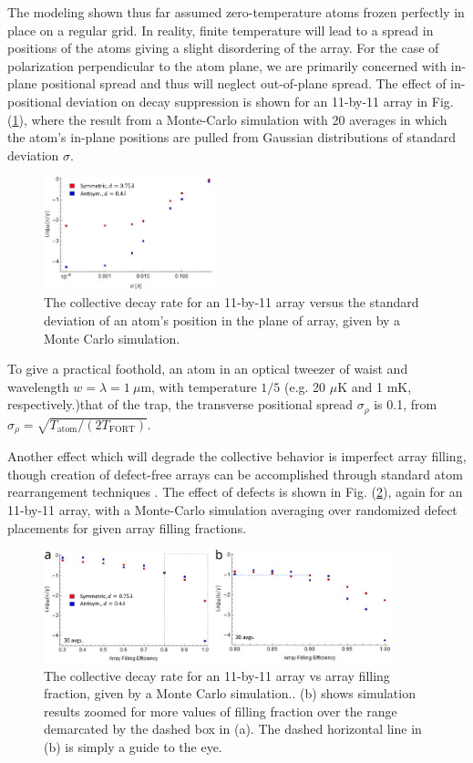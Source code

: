 The modeling shown thus far assumed zero-temperature atoms frozen perfectly in place on a regular grid. In reality, finite temperature will lead to a spread in positions of the atoms giving a slight disordering of the array. For the case of polarization perpendicular to the atom plane, we are primarily concerned with in-plane positional spread and thus will neglect out-of-plane spread. The effect of in-positional deviation on decay suppression is shown for an 11-by-11 array in Fig. (\ref{fig:superradiance_vs_atomspread}), where the result from a Monte-Carlo simulation with 20 averages in which the atom's in-plane positions are pulled from Gaussian distributions of standard deviation $\sigma$.
\begin{figure}[!ht]
    \centering
    \includegraphics[width=0.45\textwidth]{Images/superradiance_vs_atom_spread.pdf}
    \caption{The collective decay rate for an 11-by-11 array versus the standard deviation of an atom's position in the plane of array, given by a Monte Carlo simulation.}
    \label{fig:superradiance_vs_atomspread}
\end{figure}
To give a practical foothold, an atom in an optical tweezer of waist and wavelength $w=\lambda=1~\mu$m, with temperature $1/5$ (e.g. 20 $\mu$K and 1 mK, respectively.)that of the trap, the transverse positional spread $\sigma_{\rho}$ is 0.1, from $\sigma_{\rho} = \sqrt{T_{\textrm{atom}}/(2T_{\textrm{FORT}})}$.
 
Another effect which will degrade the collective behavior is imperfect array filling, though creation of defect-free arrays can be accomplished through standard atom rearrangement techniques \cite{Ebadi2021}. The effect of defects is shown in Fig. (\ref{fig:superradiance_vs_eff}), again for an 11-by-11 array, with a Monte-Carlo simulation averaging over randomized defect placements for given array filling fractions.
\begin{figure}[!ht]
    \centering
    \includegraphics[width=0.9\textwidth]{Images/superradiance_vs_array_efficiency.pdf}
    \caption{The collective decay rate for an 11-by-11 array vs array filling fraction, given by a Monte Carlo simulation.. (b) shows simulation results zoomed for more values of filling fraction over the range demarcated by the dashed box in (a). The dashed horizontal line in (b) is simply a guide to the eye.}
    \label{fig:superradiance_vs_eff}
\end{figure}

